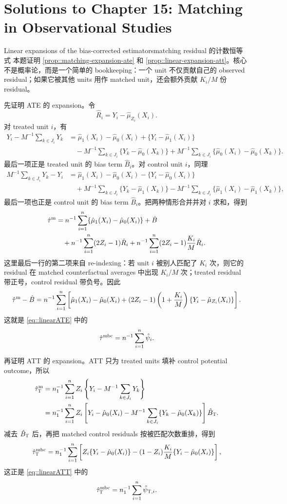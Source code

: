 \chapter{Solutions to Chapter 15: Matching in Observational Studies}
\label{sol:chapter15}

\begin{exercisesolution}{Linear expansions of the bias-corrected estimators}{matching residual 的计数恒等式}
本题证明 \cref{prop::matching-expansion-ate} 和 \cref{prop::linear-expansion-att}。核心不是概率论，而是一个简单的 bookkeeping：一个 unit 不仅贡献自己的 observed residual；如果它被其他 units 用作 matched unit，还会额外贡献 $K_i/M$ 份 residual。

先证明 ATE 的 expansion。令
\[
\hat R_i=Y_i-\hat\mu_{Z_i}(X_i).
\]
对 treated unit $i$，有
\begin{align*}
Y_i-M^{-1}\sum_{k\in J_i}Y_k
&=\hat\mu_1(X_i)-\hat\mu_0(X_i)
  +\{Y_i-\hat\mu_1(X_i)\}  \\
&\quad
  -M^{-1}\sum_{k\in J_i}\{Y_k-\hat\mu_0(X_k)\}
  +M^{-1}\sum_{k\in J_i}\{\hat\mu_0(X_i)-\hat\mu_0(X_k)\}.
\end{align*}
最后一项正是 treated unit 的 bias term $\hat B_i$。对 control unit $i$，同理
\begin{align*}
M^{-1}\sum_{k\in J_i}Y_k-Y_i
&=\hat\mu_1(X_i)-\hat\mu_0(X_i)
  -\{Y_i-\hat\mu_0(X_i)\}  \\
&\quad
  +M^{-1}\sum_{k\in J_i}\{Y_k-\hat\mu_1(X_k)\}
  -M^{-1}\sum_{k\in J_i}\{\hat\mu_1(X_i)-\hat\mu_1(X_k)\},
\end{align*}
最后一项也正是 control unit 的 bias term $\hat B_i$。把两种情形合并并对 $i$ 求和，得到
\begin{align*}
\hat\tau^{\textup{m}}
&=n^{-1}\sum_{i=1}^n\{\hat\mu_1(X_i)-\hat\mu_0(X_i)\}
  +\hat B  \\
&\quad
  +n^{-1}\sum_{i=1}^n (2Z_i-1)\hat R_i
  +n^{-1}\sum_{i=1}^n (2Z_i-1){K_i\over M}\hat R_i.
\end{align*}
这里最后一行的第二项来自 re-indexing：若 unit $i$ 被别人匹配了 $K_i$ 次，则它的 residual 在 matched counterfactual averages 中出现 $K_i/M$ 次；treated residual 带正号，control residual 带负号。因此
\[
\hat\tau^{\textup{m}}-\hat B
=n^{-1}\sum_{i=1}^n\left[
\hat\mu_1(X_i)-\hat\mu_0(X_i)
 +(2Z_i-1)\left(1+{K_i\over M}\right)
 \{Y_i-\hat\mu_{Z_i}(X_i)\}
\right].
\]
这就是 \cref{eq::linearATE} 中的
\[
\hat\tau^{\textup{mbc}}=n^{-1}\sum_{i=1}^n\hat\psi_i.
\]

再证明 ATT 的 expansion。ATT 只为 treated units 填补 control potential outcome，所以
\begin{align*}
\hat\tau_\textsc{T}^{\textup{m}}
&=n_1^{-1}\sum_{i=1}^n Z_i
\left\{
Y_i-M^{-1}\sum_{k\in J_i}Y_k
\right\}  \\
&=n_1^{-1}\sum_{i=1}^n Z_i
\left[
Y_i-\hat\mu_0(X_i)
-M^{-1}\sum_{k\in J_i}\{Y_k-\hat\mu_0(X_k)\}
\right]
\hat B_\textsc{T}.
\end{align*}
减去 $\hat B_\textsc{T}$ 后，再把 matched control residuals 按被匹配次数重排，得到
\[
\hat\tau_\textsc{T}^{\textup{mbc}}
=n_1^{-1}\sum_{i=1}^n
\left[
Z_i\{Y_i-\hat\mu_0(X_i)\}
-(1-Z_i){K_i\over M}\{Y_i-\hat\mu_0(X_i)\}
\right],
\]
这正是 \cref{eq::linearATT} 中的
\[
\hat\tau_\textsc{T}^{\textup{mbc}}
=n_1^{-1}\sum_{i=1}^n \hat\psi_{\textsc{T},i}.
\]


\end{exercisesolution}
